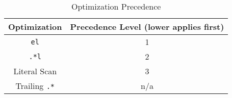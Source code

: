 \begin{table}
\caption{Optimization Precedence}
\label{table:optprec}

\centering

\begin{tabular}{| c | c |} \hline
Optimization & Precedence Level (lower applies first) \\ \hline
\verb'el' & 1 \\ \hline
\verb'.*l' & 2 \\ \hline
Literal Scan & 3 \\ \hline
Trailing \verb'.*' & n/a \\ \hline
\end{tabular}
\end{table}

% 
% 
